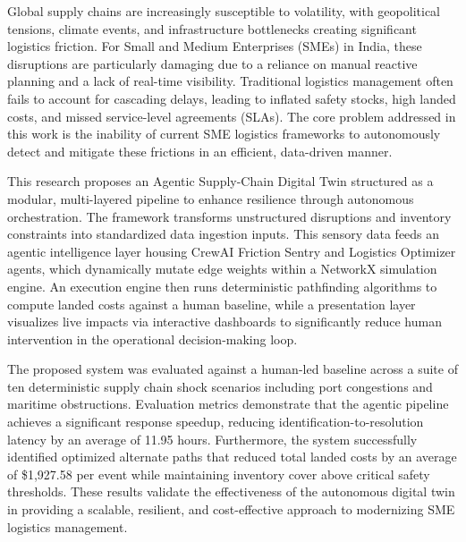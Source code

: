%
\noindent{}%
\vspace*{-1.2cm}

Global supply chains are increasingly susceptible to volatility, with geopolitical tensions, climate events, and infrastructure bottlenecks creating significant logistics friction. For Small and Medium Enterprises (SMEs) in India, these disruptions are particularly damaging due to a reliance on manual reactive planning and a lack of real-time visibility. Traditional logistics management often fails to account for cascading delays, leading to inflated safety stocks, high landed costs, and missed service-level agreements (SLAs). The core problem addressed in this work is the inability of current SME logistics frameworks to autonomously detect and mitigate these frictions in an efficient, data-driven manner.

This research proposes an Agentic Supply-Chain Digital Twin structured as a modular, multi-layered pipeline to enhance resilience through autonomous orchestration. The framework transforms unstructured disruptions and inventory constraints into standardized data ingestion inputs. This sensory data feeds an agentic intelligence layer housing CrewAI Friction Sentry and Logistics Optimizer agents, which dynamically mutate edge weights within a NetworkX simulation engine. An execution engine then runs deterministic pathfinding algorithms to compute landed costs against a human baseline, while a presentation layer visualizes live impacts via interactive dashboards to significantly reduce human intervention in the operational decision-making loop.

The proposed system was evaluated against a human-led baseline across a suite of ten deterministic supply chain shock scenarios including port congestions and maritime obstructions. Evaluation metrics demonstrate that the agentic pipeline achieves a significant response speedup, reducing identification-to-resolution latency by an average of 11.95 hours. Furthermore, the system successfully identified optimized alternate paths that reduced total landed costs by an average of \$1,927.58 per event while maintaining inventory cover above critical safety thresholds. These results validate the effectiveness of the autonomous digital twin in providing a scalable, resilient, and cost-effective approach to modernizing SME logistics management.

\pagebreak